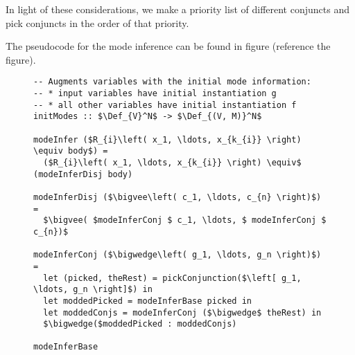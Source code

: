 In light of these considerations, we make a priority list of different conjuncts and pick conjuncts in the order of that priority. 

The pseudocode for the mode inference can be found in figure \todo(reference the figure). 


\begin{figure}[!t]
  \centering
  \begin{minipage}{\columnwidth}
    \begin{lstlisting}[label={modeInference},
                       caption={Mode inference pseudocode},
                       captionpos=b,
                       frame=tb]
-- Augments variables with the initial mode information: 
-- * input variables have initial instantiation g 
-- * all other variables have initial instantiation f 
initModes :: $\Def_{V}^N$ -> $\Def_{(V, M)}^N$

modeInfer ($R_{i}\left( x_1, \ldots, x_{k_{i}} \right) \equiv body$) = 
  ($R_{i}\left( x_1, \ldots, x_{k_{i}} \right) \equiv$ (modeInferDisj body)

modeInferDisj ($\bigvee\left( c_1, \ldots, c_{n} \right)$) =
  $\bigvee( $modeInferConj $ c_1, \ldots, $ modeInferConj $ c_{n})$  

modeInferConj ($\bigwedge\left( g_1, \ldots, g_n \right)$) = 
  let (picked, theRest) = pickConjunction($\left[ g_1, \ldots, g_n \right]$) in 
  let moddedPicked = modeInferBase picked in 
  let moddedConjs = modeInferConj ($\bigwedge$ theRest) in 
  $\bigwedge($moddedPicked : moddedConjs)

modeInferBase 

    \end{lstlisting}
  \end{minipage}
\end{figure}